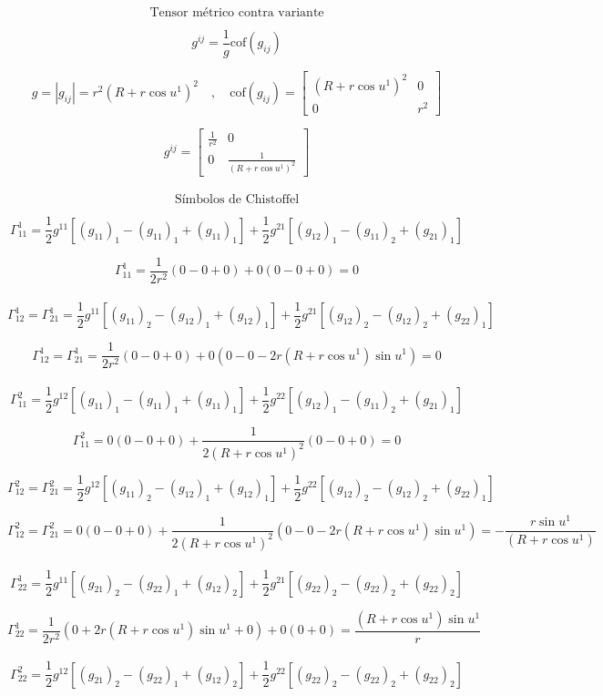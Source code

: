 \documentclass[10pt,a4papper]{article}
\begin{document}
\newpage
\[\text{Tensor métrico contra variante}\]

\[g^{ij}=\frac{1}{g}\text{cof}(g_{ij})\]

\[g=|g_{ij}|=r^2(R+r\cos u^1)^2\quad,\quad
\text{cof}(g_{ij})=
\begin{bmatrix}
(R+r\cos u^1)^2 & 0\\
0 & r^2
\end{bmatrix}\]

\[g^{ij}=
\begin{bmatrix}
\frac{1}{r^2} & 0\\
0 & \frac{1}{(R+r\cos u^1)^2}
\end{bmatrix}\]\\

\[\text{Símbolos de Chistoffel}\]

\[\Gamma_{11}^1=\frac{1}{2}g^{11}\left[(g_{11})_1-(g_{11})_1+(g_{11})_1\right]+\frac{1}{2}g^{21}\left[(g_{12})_1-(g_{11})_2+(g_{21})_1\right]\]

\[\Gamma_{11}^1=\frac{1}{2r^2}(0-0+0)+0(0-0+0)=0\]\\

\[\Gamma_{12}^1=\Gamma_{21}^1=\frac{1}{2}g^{11}\left[(g_{11})_2-(g_{12})_1+(g_{12})_1\right]+\frac{1}{2}g^{21}\left[(g_{12})_2-(g_{12})_2+(g_{22})_1\right]\]

\[\Gamma_{12}^1=\Gamma_{21}^1=\frac{1}{2r^2}(0-0+0)+0(0-0-2r(R+r\cos u^1)\sin u^1)=0\]\\

\[\Gamma_{11}^2=\frac{1}{2}g^{12}\left[(g_{11})_1-(g_{11})_1+(g_{11})_1\right]+\frac{1}{2}g^{22}\left[(g_{12})_1-(g_{11})_2+(g_{21})_1\right]\]

\[\Gamma_{11}^2=0(0-0+0)+\frac{1}{2(R+r\cos u^1)^2}(0-0+0)=0\]

\newpage
\[\Gamma_{12}^2=\Gamma_{21}^2=\frac{1}{2}g^{12}\left[(g_{11})_2-(g_{12})_1+(g_{12})_1\right]+\frac{1}{2}g^{22}\left[(g_{12})_2-(g_{12})_2+(g_{22})_1\right]\]

\[\Gamma_{12}^2=\Gamma_{21}^2=0(0-0+0)+\frac{1}{2(R+r\cos u^1)^2}(0-0-2r(R+r\cos u^1)\sin u^1)=-\frac{r\sin u^1}{(R+r\cos u^1)}\]\\

\[\Gamma_{22}^1=\frac{1}{2}g^{11}\left[(g_{21})_2-(g_{22})_1+(g_{12})_2\right]+\frac{1}{2}g^{21}\left[(g_{22})_2-(g_{22})_2+(g_{22})_2\right]\]

\[\Gamma_{22}^1=\frac{1}{2r^2}(0+2r(R+r\cos u^1)\sin u^1+0)+0(0+0)=\frac{(R+r\cos u^1)\sin u^1}{r}\]\\

\[\Gamma_{22}^2=\frac{1}{2}g^{12}\left[(g_{21})_2-(g_{22})_1+(g_{12})_2\right]+\frac{1}{2}g^{22}\left[(g_{22})_2-(g_{22})_2+(g_{22})_2\right]\]
\end{document}
